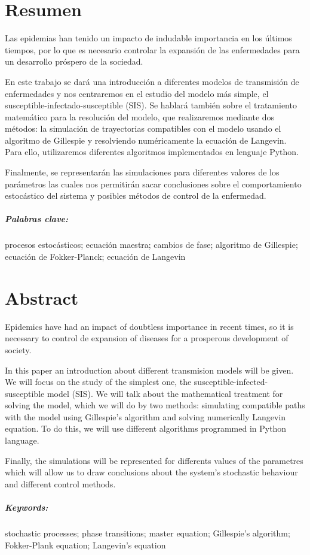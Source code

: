 \chapter*{Resumen}

Las epidemias han tenido un impacto de indudable importancia en los últimos tiempos, por lo que es
necesario controlar la expansión de las enfermedades para un desarrollo próspero de la sociedad.

En este trabajo se dará una introducción a diferentes modelos de transmisión de enfermedades y nos centraremos en 
el estudio del modelo más simple, el susceptible-infectado-susceptible (SIS). Se hablará también sobre el tratamiento 
matemático para la resolución del modelo, que realizaremos mediante dos métodos: la simulación de trayectorias compatibles
con el modelo usando el algoritmo de Gillespie y resolviendo numéricamente la ecuación de Langevin. Para ello, utilizaremos
diferentes algoritmos implementados en lenguaje Python.

Finalmente, se representarán las simulaciones para diferentes valores de los parámetros las cuales nos permitirán
sacar conclusiones sobre el comportamiento estocástico del sistema y posibles métodos de control de la enfermedad.


\paragraph{Palabras clave:}procesos estocásticos; ecuación maestra; cambios de fase; algoritmo de Gillespie; ecuación de Fokker-Planck; ecuación de Langevin

\chapter*{Abstract}
Epidemics have had an impact of doubtless importance in recent times, so it is necessary to control de expansion of 
diseases for a prosperous development of society.

In this paper an introduction about different transmision models will be given. We will focus on the study of the 
simplest one, the susceptible-infected-susceptible model (SIS). We will talk about the mathematical treatment for 
solving the model, which we will do by two methods: simulating compatible paths with the model using Gillespie's 
algorithm and solving numerically Langevin equation. To do this, we will use different algorithms programmed
in Python language.

Finally, the simulations will be represented for differents values of the parametres which will allow us to draw conclusions 
about the system's stochastic behaviour and different control methods. 
\paragraph{Keywords:}stochastic processes; phase transitions; master equation; Gillespie's algorithm; Fokker-Plank equation; Langevin's equation